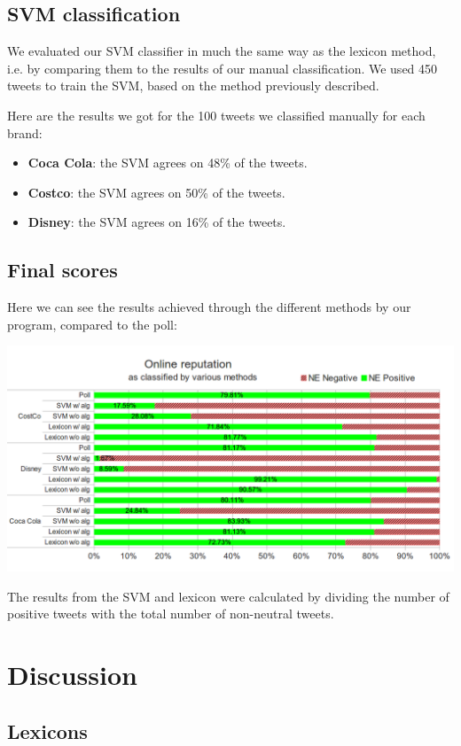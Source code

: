 \documentclass[a4paper,12pt]{report}
\begin{document}
\section{SVM classification}

We evaluated our SVM classifier in much the same way as the lexicon method, i.e. by comparing them to the results of our manual classification.
We used 450 tweets to train the SVM, based on the method previously described.

Here are the results we got for the 100 tweets we classified manually for each brand:
\begin{itemize}
        \item \textbf{Coca Cola}: the SVM agrees on 48\% of the tweets.
        \item \textbf{Costco}: the SVM agrees on 50\% of the tweets.
        \item \textbf{Disney}: the SVM agrees on 16\% of the tweets.
\end{itemize}

\section{Final scores}
Here we can see the results achieved through the different methods by our program, compared to the poll:


\centerline{\includegraphics[scale=0.55]{../img/full1.png}}


The results from the SVM and lexicon were calculated by dividing the number of positive tweets with the total number of non-neutral tweets.

\chapter{Discussion}

\section{Lexicons}
\end{document}
